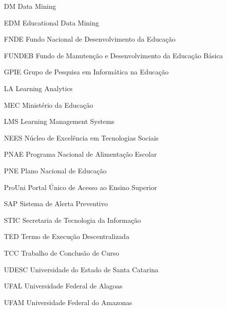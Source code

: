 
\listoffigures*
\cleardoublepage



\listoftables*
\cleardoublepage

\begin{siglas}
\item[DM]   Data Mining
\item[EDM]     {Educational Data Mining}
\item[FNDE]    {Fundo Nacional de Desenvolvimento da Educação}
\item[FUNDEB]  {Fundo de Manutenção e Desenvolvimento da Educação Básica}
\item[GPIE]    {Grupo de Pesquisa em Informática na Educação}
\item[LA]      {Learning Analytics}
\item[MEC]     {Ministério da Educação}
\item[LMS]     {Learning Management Systems}
\item[NEES]    {Núcleo de Excelência em Tecnologias Sociais}
\item[PNAE]    {Programa Nacional de Alimentação Escolar}
\item[PNE]     {Plano Nacional de Educação}
\item[ProUni]  {Portal Único de Acesso ao Ensino Superior} 
\item[SAP]     {Sistema de Alerta Preventivo}
\item[STIC]    {Secretaria de Tecnologia da Informação}
\item[TED]     {Termo de Execução Descentralizada}
\item[TCC]     {Trabalho de Conclusão de Curso}
\item[UDESC]   {Universidade do Estado de Santa Catarina}
\item[UFAL]    {Universidade Federal de Alagoas}
\item[UFAM]    {Universidade Federal do Amazonas}
\end{siglas}





